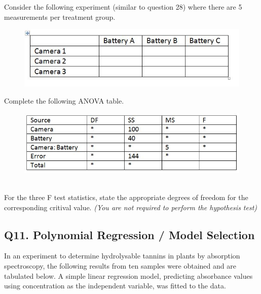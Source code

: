 \documentclass[a4paper,12pt]{article}
\begin{document}
Consider the following experiment (similar to question 28) where there are 5 measurements per treatment group.
\begin{figure}[h!]
	\centering
	\includegraphics[width=0.8\linewidth]{image/Q29Review}
\end{figure}
Complete the following ANOVA table.\\ \bigskip
\begin{figure}[h!]
	\centering
	\includegraphics[width=0.8\linewidth]{image/Q29Review2}
\end{figure}\\


For the three F test statistics, state the appropriate degrees of freedom for the corresponding critival value. \textit{(You are not required to perform the hypothesis test)}
\newpage
\subsection*{Q11. Polynomial Regression / Model Selection}

In an experiment to determine hydrolysable tannins in plants by absorption spectroscopy, the following results from ten samples were obtained and are tabulated below. A simple linear regression model, predicting absorbance values using concentration as the independent variable, was fitted to the data.



\end{document}
